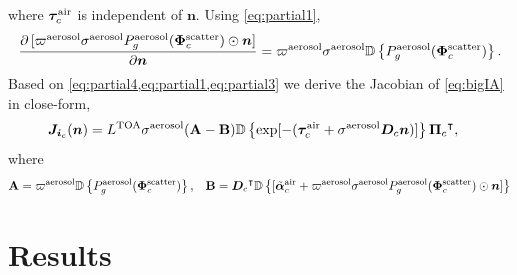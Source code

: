 \documentclass[10pt,letterpaper]{article}
\newcommand{\OpDiag}[1]{\mathbb{D}\left\{#1\right\}}
\newcommand{\abbrev}[1]{\rm{#1}}
\newcommand{\PartDeriv}[2]{\frac{\partial{#1}}{\partial{#2}}}
\newcommand{\vect}[1]{\bm{#1}}
\newcommand{\transpose}[1]{{#1}^\intercal}
\begin{document}
where $\vect{\tau}_c^{\rm air}$ is independent of ${\bm n}$. Using
\cref{eq:partial1},
\begin{align}
  \label{eq:partial3}
  \PartDeriv{\, [\varpi^{\rm aerosol}\sigma^{\rm aerosol} P^{\rm
      aerosol}_g(\vect{\Phi}^{\rm scatter}_c) \odot{\bm n}]}{\vect{n}}
  = \varpi^{\rm aerosol}\sigma^{\rm aerosol}\OpDiag{P^{\rm
      aerosol}_g(\vect{\Phi}^{\rm scatter}_c)}.
\end{align}
Based on \cref{eq:partial4,eq:partial1,eq:partial3} we derive the
Jacobian of \cref{eq:bigIA} in close-form,
\begin{align}
  {\bm J}_{{\bm i}_c}({\bm n}) &= L^{\rm TOA}{\sigma}^{\rm
    aerosol}({\bf A}-{\bf B}) \OpDiag{\exp[-(\vect{\tau}_c^{\rm air} +
    {\sigma}^{\rm aerosol} {\bm D}_c {\bm n})]}
  \transpose{{\vect{\Pi}}_c} ,
  \label{eq:gradient2}
\end{align}
where
\begin{equation}
  \label{eq:gradient3}
  {\bf A} = \varpi^{\rm aerosol}
  \OpDiag{ P_g^{\rm aerosol}(\vect{\Phi}^{\rm scatter}_c)}
  ,\;\;\;
  {\bf B} = \transpose{{\bm D}_c}
  \OpDiag{[\tilde{\vect{\alpha}}^{\rm air}_c + \varpi^{\rm
      aerosol}\sigma^{\rm aerosol} P^{\rm aerosol}_g(\vect{\Phi}^{\rm
      scatter}_c) \odot{\bm n}    ]}
\end{equation}



\section{Results}
\label{sec:optimization-results}
\end{document}
